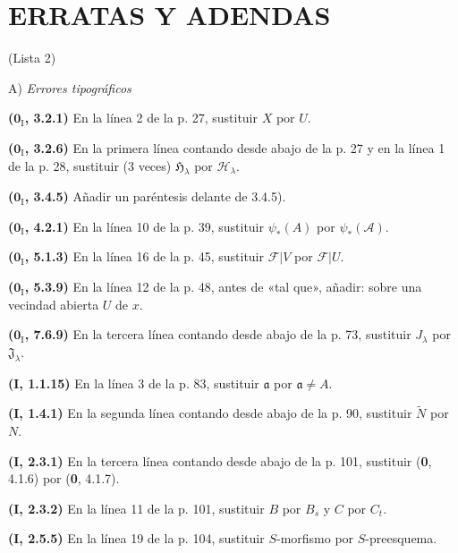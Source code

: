 \clearpage
{}
\thispagestyle{empty}
\null
\clearpage

\section*{ERRATAS Y ADENDAS}
\begin{center}
(Lista 2)

\medskip
A) \emph{Errores tipográficos}
\end{center}

\noindent\textbf{($\mathbf{0}_{\mathrm I}$, 3.2.1)} En la línea 2 de la p. 27, sustituir
$X$ por $U$.

\noindent\textbf{($\mathbf{0}_{\mathrm I}$, 3.2.6)} En la primera línea contando desde
abajo de la p. 27 y en la línea 1 de la p. 28, sustituir (3 veces)
$\mathfrak H_\lambda$ por $\mathscr H_\lambda$.

\noindent\textbf{($\mathbf{0}_{\mathrm I}$, 3.4.5)} Añadir un paréntesis delante de
3.4.5).

\noindent\textbf{($\mathbf{0}_{\mathrm I}$, 4.2.1)} En la línea 10 de la p. 39,
sustituir $\psi_*(A)$ por $\psi_*(\mathscr A)$.

\noindent\textbf{($\mathbf{0}_{\mathrm I}$, 5.1.3)} En la línea 16 de la p. 45,
sustituir $\mathscr F|V$ por $\mathscr F|U$.

\noindent\textbf{($\mathbf{0}_{\mathrm I}$, 5.3.9)} En la línea 12 de la p. 48, antes
de «tal que», añadir: sobre una vecindad abierta $U$ de $x$.

\noindent\textbf{($\mathbf{0}_{\mathrm I}$, 7.6.9)} En la tercera línea contando desde
abajo de la p. 73, sustituir $J_\lambda$ por $\mathfrak J_\lambda$.

\noindent\textbf{(I, 1.1.15)} En la línea 3 de la p. 83, sustituir
$\mathfrak a$ por $\mathfrak a\ne A$.

\noindent\textbf{(I, 1.4.1)} En la segunda línea contando desde abajo de la
p. 90, sustituir $\widetilde N$ por $N$.

\noindent\textbf{(I, 2.3.1)} En la tercera línea contando desde abajo de la
p. 101, sustituir (\textbf 0, 4.1.6) por (\textbf 0, 4.1.7).

\noindent\textbf{(I, 2.3.2)} En la línea 11 de la p. 101, sustituir $B$ por
$B_s$ y $C$ por $C_t$.

\noindent\textbf{(I, 2.5.5)} En la línea 19 de la p. 104, sustituir
$S$-morfismo por $S$-preesquema.

